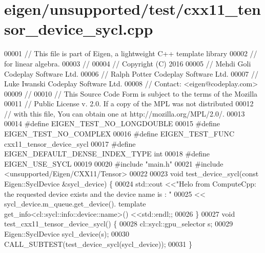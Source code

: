 \hypertarget{eigen_2unsupported_2test_2cxx11__tensor__device__sycl_8cpp_source}{}\section{eigen/unsupported/test/cxx11\+\_\+tensor\+\_\+device\+\_\+sycl.cpp}
\label{eigen_2unsupported_2test_2cxx11__tensor__device__sycl_8cpp_source}

\begin{DoxyCode}
00001 \textcolor{comment}{// This file is part of Eigen, a lightweight C++ template library}
00002 \textcolor{comment}{// for linear algebra.}
00003 \textcolor{comment}{//}
00004 \textcolor{comment}{// Copyright (C) 2016}
00005 \textcolor{comment}{// Mehdi Goli    Codeplay Software Ltd.}
00006 \textcolor{comment}{// Ralph Potter  Codeplay Software Ltd.}
00007 \textcolor{comment}{// Luke Iwanski  Codeplay Software Ltd.}
00008 \textcolor{comment}{// Contact: <eigen@codeplay.com>}
00009 \textcolor{comment}{//}
00010 \textcolor{comment}{// This Source Code Form is subject to the terms of the Mozilla}
00011 \textcolor{comment}{// Public License v. 2.0. If a copy of the MPL was not distributed}
00012 \textcolor{comment}{// with this file, You can obtain one at http://mozilla.org/MPL/2.0/.}
00013 
00014 \textcolor{preprocessor}{#define EIGEN\_TEST\_NO\_LONGDOUBLE}
00015 \textcolor{preprocessor}{#define EIGEN\_TEST\_NO\_COMPLEX}
00016 \textcolor{preprocessor}{#define EIGEN\_TEST\_FUNC cxx11\_tensor\_device\_sycl}
00017 \textcolor{preprocessor}{#define EIGEN\_DEFAULT\_DENSE\_INDEX\_TYPE int}
00018 \textcolor{preprocessor}{#define EIGEN\_USE\_SYCL}
00019 
00020 \textcolor{preprocessor}{#include "main.h"}
00021 \textcolor{preprocessor}{#include <unsupported/Eigen/CXX11/Tensor>}
00022 
00023 \textcolor{keywordtype}{void} test\_device\_sycl(\textcolor{keyword}{const} Eigen::SyclDevice &sycl\_device) \{
00024   std::cout <<\textcolor{stringliteral}{"Helo from ComputeCpp: the requested device exists and the device name is : "}
00025     << sycl\_device.m\_queue.get\_device(). \textcolor{keyword}{template} get\_info<cl::sycl::info::device::name>() <<std::endl;;
00026 \}
00027 \textcolor{keywordtype}{void} test\_cxx11\_tensor\_device\_sycl() \{
00028   cl::sycl::gpu\_selector s;
00029   Eigen::SyclDevice sycl\_device(s);
00030   CALL\_SUBTEST(test\_device\_sycl(sycl\_device));
00031 \}
\end{DoxyCode}
